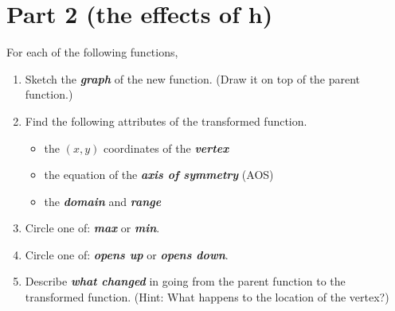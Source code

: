 \section*{Part 2 (the effects of $\bm{h}$)}

{
\small
For each of the following functions,
\begin{enumerate}[nosep]
    \item Sketch the {\bfseries\itshape graph} of the new function. (Draw it on top of the parent function.)
    \item Find the following attributes of the transformed function.
    \begin{itemize}[nosep]
        \item the $(x,y)$ coordinates of the {\bfseries\itshape vertex}
        \item the equation of the {\bfseries\itshape axis of symmetry} (AOS)
        \item the {\bfseries\itshape domain} and {\bfseries\itshape range}
    \end{itemize}
    \item Circle one of: {\bfseries\itshape max} or {\bfseries\itshape min}.
    \item Circle one of: {\bfseries\itshape opens up} or {\bfseries\itshape opens down}.
    \item Describe {\bfseries\itshape what changed} in going from the parent function to the transformed function.
        (Hint: What happens to the location of the vertex?)
\end{enumerate}
}
\vspace{\baselineskip}

\begin{tcbposter}[
        poster = {
            rows=7,
            columns=2,
            height=10cm,
            spacing=1mm,
            },
        boxes = {colbacktitle=black!15,coltitle=black,colback=white,sharp corners}
    ]
\end{tcbposter}





